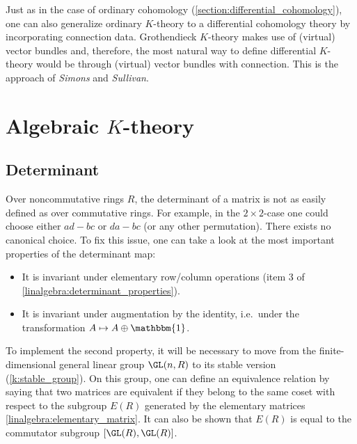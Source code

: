     Just as in the case of ordinary cohomology (\cref{section:differential_cohomology}), one can also generalize ordinary $K$-theory to a differential cohomology theory by incorporating connection data. Grothendieck $K$-theory makes use of (virtual) vector bundles and, therefore, the most natural way to define differential $K$-theory would be through (virtual) vector bundles with connection. This is the approach of \textit{Simons} and \textit{Sullivan}.


\section{\texorpdfstring{Algebraic $K$-theory}{Algebraic K-theory}}
\subsection{Determinant}

    Over noncommutative rings $R$, the determinant of a matrix is not as easily defined as over commutative rings. For example, in the $2\times2$-case one could choose either $ad-bc$ or $da-bc$ (or any other permutation). There exists no canonical choice. To fix this issue, one can take a look at the most important properties of the determinant map:
    \begin{itemize}
        \item It is invariant under elementary row/column operations (item 3 of \cref{linalgebra:determinant_properties}).
        \item It is invariant under augmentation by the identity, i.e.~under the transformation $A\mapsto A\oplus\mathbbm{1}$.
    \end{itemize}
    To implement the second property, it will be necessary to move from the finite-dimensional general linear group $\GL(n,R)$ to its stable version (\cref{k:stable_group}). On this group, one can define an equivalence relation by saying that two matrices are equivalent if they belong to the same coset with respect to the subgroup $E(R)$ generated by the elementary matrices \ref{linalgebra:elementary_matrix}. It can also be shown that $E(R)$ is equal to the commutator subgroup $[\GL(R),\GL(R)]$.

